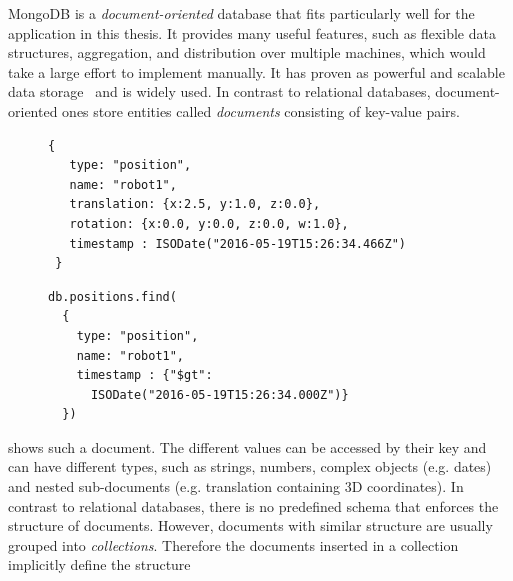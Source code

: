 MongoDB is a \emph{document-oriented}
database that fits particularly well for the application in this thesis. It
provides many useful features, such as flexible data structures, aggregation,
and distribution over multiple machines, which would take a large effort to
implement manually. It has proven as powerful and scalable data
storage~\cite{mongodb,RoboDB} and is widely used. In contrast to
relational databases, document-oriented ones store entities called
\emph{documents} consisting of key-value pairs.
\begin{figure}
  \begin{minipage}{0.6\linewidth}
\begin{lstlisting}[style=SmallJSON,
  caption={MongoDB document representing\protect\\ the position of a robot},
  label=lst:mongo-document,
  framexleftmargin=2pt, xleftmargin=2pt,
 morekeywords={}, numbers=none]
 {
   type: "position",
   name: "robot1",
   translation: {x:2.5, y:1.0, z:0.0},
   rotation: {x:0.0, y:0.0, z:0.0, w:1.0},
   timestamp : ISODate("2016-05-19T15:26:34.466Z")
 }
\end{lstlisting}
  \end{minipage}
  \begin{minipage}{0.4\linewidth}
\begin{lstlisting}[style=SmallJSON,
  caption={MongoDB query yielding the document in \reflst{lst:mongo-document}},
  label=lst:mongo-query,
  framexleftmargin=2pt, xleftmargin=10pt,
 morekeywords={}, numbers=none]
db.positions.find(
  {
    type: "position",
    name: "robot1",
    timestamp : {"$gt":
      ISODate("2016-05-19T15:26:34.000Z")}
  })
\end{lstlisting}
  \end{minipage}
  \vspace{-0.8cm}
\end{figure}
 shows such a document.
The different
values can be accessed by their key and can have different types, such
as strings, numbers, complex objects (e.g. dates) and nested
sub-documents (e.g. translation containing 3D coordinates). In
contrast to relational databases, there is no predefined schema that
enforces the structure of documents. However, documents with similar
structure are usually grouped into \emph{collections}. Therefore the
documents inserted in a collection implicitly define the structure
